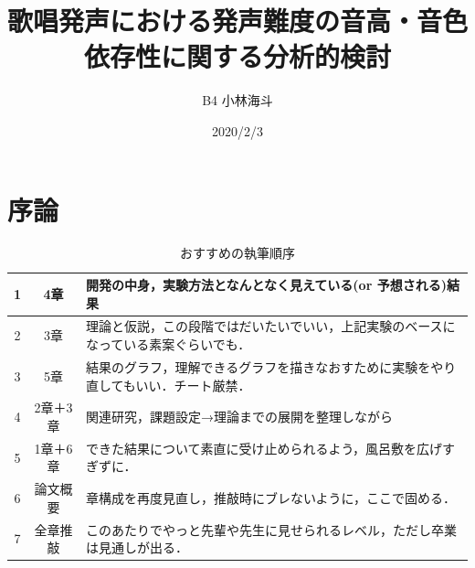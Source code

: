 \documentclass[10ptj,a4j,dvipdfmx,uplatex, draft]{jsbook}%
\title{歌唱発声における発声難度の音高・音色依存性に関する分析的検討}
\author{B4 小林海斗}
\date{2020/2/3}
\begin{document}

\chapter{序論}

\begin{table}[h]
\caption{おすすめの執筆順序}%
\begin{center}
\begin{tabular}{|c|c|l|} %
\hline
1 & 4章 & 開発の中身，実験方法となんとなく見えている(or 予想される)結果 \\
\hline
2 & 3章 & 理論と仮説，この段階ではだいたいでいい，上記実験のベースになっている素案ぐらいでも． \\
\hline
3 & 5章 & 結果のグラフ，理解できるグラフを描きなおすために実験をやり直してもいい．チート厳禁． \\
\hline
4 & 2章＋3章 & 関連研究，課題設定→理論までの展開を整理しながら \\
\hline
5 & 1章＋6章 & できた結果について素直に受け止められるよう，風呂敷を広げすぎずに． \\
\hline
6 & 論文概要 & 章構成を再度見直し，推敲時にブレないように，ここで固める． \\
\hline
7 & 全章推敲 & このあたりでやっと先輩や先生に見せられるレベル，ただし卒業は見通しが出る． \\
\hline
\end{tabular}
\end{center}
\end{table}
\end{document}
